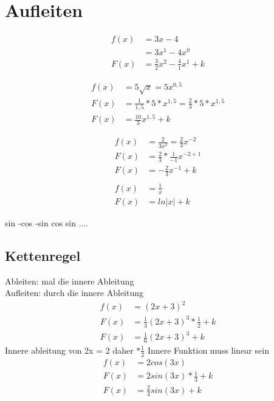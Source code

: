 
\section{Aufleiten}

\begin{align*}
f(x) &= 3x -4 \\
     &= 3x^1 -4x^0 \\
F(x) &= \frac{3}{2}x^2 - \frac{4}{1} x^1 +k
\end{align*}

\begin{align*}
  f(x) &= 5 \sqrt{x} = 5x^{0,5} \\
  F(x) &= \frac{1}{1,5}* 5*x^{1,5}  = \frac{2}{3} * 5 * x^{1,5} \\
  F(x) &= \frac{10}{3} x^{1,5} + k
\end{align*}

\begin{align*}
  f(x) &=  \frac{2}{3x^2} = \frac{2}{3}x^{-2} \\
  F(x) &= \frac{2}{3} * \frac{1}{-1} x^{-2+1} \\
  F(x) &= - \frac{2}{3} x^{-1} + k \\
  \\
  f(x) &= \frac{1}{x} \\
  F(x) &= ln |x| +k
\end{align*}


sin -cos -sin  cos sin .... \\

\subsection{Kettenregel}
Ableiten: mal die innere Ableitung\\
Aufleiten: durch die innere Ableitung\\


\begin{align*}
  f(x) &=  (2x + 3)^2\\
  F(x) &= \frac{1}{3} (2x +3)^3 * \frac{1}{2} + k \\
  F(x) &= \frac{1}{6} (2x +3)^3 +k
\end{align*}
Innere ableitung von 2x = 2 daher $* \frac{1}{2}$
Innere Funktion muss linear sein \\

\begin{align*}
  f(x) &= 2 cos(3x)\\
  F(x) &= 2 sin(3x) * \frac{1}{3} +k \\
  F(x) &= \frac{2}{3} sin(3x) + k
\end{align*}

